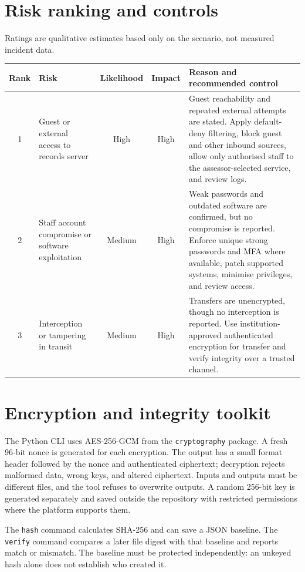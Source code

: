 \documentclass[11pt,a4paper]{article}
\begin{document}
\section{Risk ranking and controls}
Ratings are qualitative estimates based only on the scenario, not measured incident data.
\begin{tabularx}{\textwidth}{c>{\raggedright\arraybackslash}p{}ccX}
\toprule
Rank & Risk & Likelihood & Impact & Reason and recommended control\\
\midrule
1 & Guest or external access to records server & High & High & Guest reachability and repeated external attempts are stated. Apply default-deny filtering, block guest and other inbound sources, allow only authorised staff to the assessor-selected service, and review logs.\\
2 & Staff account compromise or software exploitation & Medium & High & Weak passwords and outdated software are confirmed, but no compromise is reported. Enforce unique strong passwords and MFA where available, patch supported systems, minimise privileges, and review access.\\
3 & Interception or tampering in transit & Medium & High & Transfers are unencrypted, though no interception is reported. Use institution-approved authenticated encryption for transfer and verify integrity over a trusted channel.\\
\bottomrule
\end{tabularx}

\section{Encryption and integrity toolkit}
The Python CLI uses AES-256-GCM from the \texttt{cryptography} package. A fresh 96-bit nonce is generated for each encryption. The output has a small format header followed by the nonce and authenticated ciphertext; decryption rejects malformed data, wrong keys, and altered ciphertext. Inputs and outputs must be different files, and the tool refuses to overwrite outputs. A random 256-bit key is generated separately and saved outside the repository with restricted permissions where the platform supports them.

The \texttt{hash} command calculates SHA-256 and can save a JSON baseline. The \texttt{verify} command compares a later file digest with that baseline and reports match or mismatch. The baseline must be protected independently: an unkeyed hash alone does not establish who created it.
\end{document}
